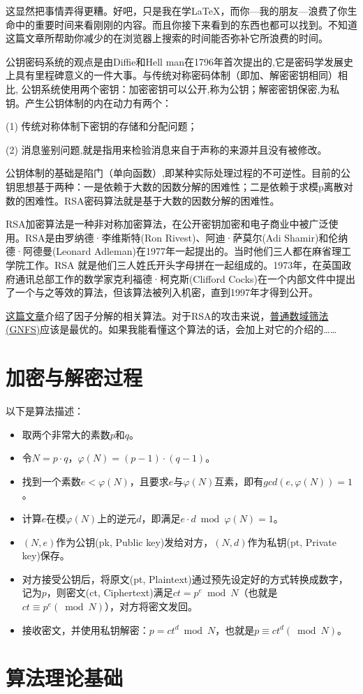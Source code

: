 \documentclass[a4paper]{article}  %
\begin{document}
\clearpage
这显然把事情弄得更糟。好吧，只是我在学\LaTeX，而你---我的朋友---浪费了你生命中的重要时间来看刚刚的内容。而且你接下来看到的东西也都可以找到。不知道这篇文章所帮助你减少的在浏览器上搜索的时间能否弥补它所浪费的时间。

公钥密码系统的观点是由Diffie和Hell man在1796年首次提出的,它是密码学发展史上具有里程碑意义的一件大事。与传统对称密码体制（即加、解密密钥相同）相比,
公钥系统使用两个密钥：加密密钥可以公开,称为公钥；解密密钥保密,为私钥。产生公钥体制的内在动力有两个：

(1) 传统对称体制下密钥的存储和分配问题；

(2) 消息鉴别问题,就是指用来检验消息来自于声称的来源并且没有被修改。

公钥体制的基础是陷门（单向函数）,即某种实际处理过程的不可逆性。目前的公钥思想基于两种：一是依赖于大数的因数分解的困难性；二是依赖于求模p离散对数的困难性。RSA密码算法就是基于大数的因数分解的困难性。

RSA加密算法是一种非对称加密算法，在公开密钥加密和电子商业中被广泛使用。RSA是由罗纳德·李维斯特(Ron Rivest)、阿迪·萨莫尔(Adi Shamir)和伦纳德·阿德曼(Leonard Adleman)在1977年一起提出的。当时他们三人都在麻省理工学院工作。RSA 就是他们三人姓氏开头字母拼在一起组成的。1973年，在英国政府通讯总部工作的数学家克利福德·柯克斯(Clifford Cocks)在一个内部文件中提出了一个与之等效的算法，但该算法被列入机密，直到1997年才得到公开。

\href{https://mathmu.github.io/MTCAS/doc/IntegerFactorization.html}{这篇文章}介绍了因子分解的相关算法。对于RSA的攻击来说，\href{https://zh.wikipedia.org/wiki/%E6%99%AE%E9%80%9A%E6%95%B0%E5%9F%9F%E7%AD%9B%E9%80%89%E6%B3%95}{普通数域筛法(GNFS)}应该是最优的。如果我能看懂这个算法的话，会加上对它的介绍的……%

\section[算法描述]{加密与解密过程}

以下是算法描述：
\begin{itemize}
    \item 取两个非常大的素数$p$和$q$。
    \item 令$N = p \cdot q$，$\varphi(N) = (p - 1) \cdot (q - 1)$。
    \item 找到一个素数$e < \varphi(N)$，且要求$e$与$\varphi(N)$互素，即有$gcd(e, \varphi(N)) = 1$。 %
    \item 计算$e$在模$\varphi(N)$上的逆元$d$，即满足$e \cdot d \bmod \varphi(N) = 1$。
    \item $(N, e)$作为公钥(pk, Public key)发给对方，$(N, d)$作为私钥(pt, Private key)保存。
    \item 对方接受公钥后，将原文(pt, Plaintext)通过预先设定好的方式转换成数字，记为$p$，则密文(ct, Ciphertext)满足$ct = p ^ e \bmod N$（也就是$ct \equiv p ^ e (\bmod N)$），对方将密文发回。
    \item 接收密文，并使用私钥解密：$p = ct ^ d \bmod N$，也就是$p \equiv ct ^ d (\bmod N)$。
\end{itemize}

\section{算法理论基础}


\end{document}
